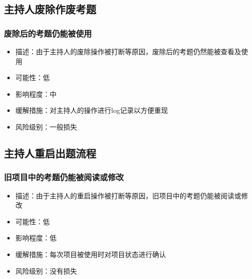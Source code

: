 \documentclass[hyperref, a4paper]{ctexart}
\providecommand{\tightlist}{%
  \setlength{\itemsep}{0pt}\setlength{\parskip}{0pt}}
\begin{document}
\hypertarget{ux4e3bux6301ux4ebaux5e9fux9664ux4f5cux5e9fux8003ux9898-1}{%
\subsection{主持人废除作废考题}\label{ux4e3bux6301ux4ebaux5e9fux9664ux4f5cux5e9fux8003ux9898-1}}

\hypertarget{ux5e9fux9664ux540eux7684ux8003ux9898ux4ecdux80fdux88abux4f7fux7528}{%
\subsubsection{废除后的考题仍能被使用}\label{ux5e9fux9664ux540eux7684ux8003ux9898ux4ecdux80fdux88abux4f7fux7528}}

\begin{itemize}
\tightlist
\item
  描述：由于主持人的废除操作被打断等原因，废除后的考题仍然能被查看及使用
\item
  可能性：低
\item
  影响程度：中
\item
  缓解措施：对主持人的操作进行log记录以方便重现
\item
  风险级别：一般损失
\end{itemize}

\hypertarget{ux4e3bux6301ux4ebaux91cdux542fux51faux9898ux6d41ux7a0b-1}{%
\subsection{主持人重启出题流程}\label{ux4e3bux6301ux4ebaux91cdux542fux51faux9898ux6d41ux7a0b-1}}

\hypertarget{ux65e7ux9879ux76eeux4e2dux7684ux8003ux9898ux4ecdux80fdux88abux9605ux8bfbux6216ux4feeux6539}{%
\subsubsection{旧项目中的考题仍能被阅读或修改}\label{ux65e7ux9879ux76eeux4e2dux7684ux8003ux9898ux4ecdux80fdux88abux9605ux8bfbux6216ux4feeux6539}}

\begin{itemize}
\tightlist
\item
  描述：由于主持人的重启操作被打断等原因，旧项目中的考题仍能被阅读或修改
\item
  可能性：低
\item
  影响程度：低
\item
  缓解措施：每次项目被使用时对项目状态进行确认
\item
  风险级别：没有损失
\end{itemize}
\end{document}
